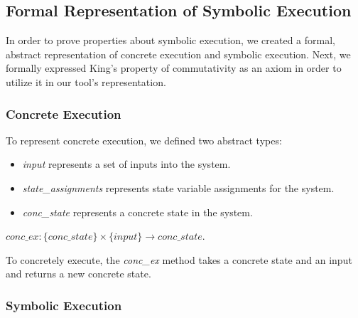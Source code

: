 \subsection{Formal Representation of Symbolic Execution}
In order to prove properties about symbolic execution, we created a formal, abstract representation of concrete execution and symbolic execution.
Next, we formally expressed King's property of commutativity as an axiom in order to utilize it in our tool's representation.

\subsubsection{Concrete Execution}
To represent concrete execution, we defined two abstract types: 
\begin{itemize}
\item \emph{input} represents a set of inputs into the system.
\item \emph{state\_assignments}  represents state variable assignments for the system.
\item \emph{conc\_state} represents a concrete state in the system.
\end{itemize}

\begin{define} 
$conc\_ex: \{conc\_state\} \times \{input\} \rightarrow conc\_state $.
\end{define}
To concretely execute, the \emph{conc\_ex} method takes a concrete state and an input and returns a new concrete state.





\subsubsection{Symbolic Execution}

